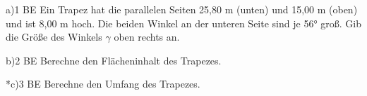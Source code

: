 \documentclass[11pt]{article}
\begin{document}
\begin{pfaufg}{}{a)}{1 BE}
Ein Trapez hat die parallelen Seiten 25,80 m (unten) und 15,00 m (oben) und ist 8,00 m hoch. Die beiden Winkel an der unteren Seite sind je 56° groß. Gib die Größe des Winkels $\gamma$ oben rechts an.
\end{pfaufg}
\begin{pfaufg}{}{b)}{2 BE}
Berechne den Flächeninhalt des Trapezes.
\end{pfaufg}
\begin{pfaufg}{}{*c)}{3 BE}
Berechne den Umfang des Trapezes.
\end{pfaufg}
\end{document}
